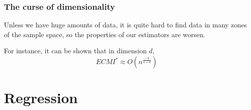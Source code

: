 \subsubsection{The curse of dimensionality}

Unless we have huge amounts of data, it is quite hard to find data in many zones of the sample space, so the properties of our estimators are worsen.

For instance, it can be shown that in dimension \(d\),
\[
ECMI^* \approx O(n^{\frac{-4}{4+d}})
\]


\section{Regression}
